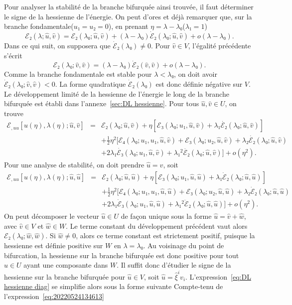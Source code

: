 \documentclass[12pt, final]{amsart}
\theoremstyle{definition}
\begin{document}
Pour analyser la stabilité de la branche bifurquée ainsi trouvée, il faut déterminer le signe de la hessienne de l'énergie. On peut d'ores et déjà remarquer que, sur la branche fondamentale(\(u₁ = u₂ = 0\)), en prenant \(η = λ - λ₀\)(\(λ₁ = 1\))
\begin{equation}
 ℰ₂(λ ; \hat{u}, \hat{v}) =ℰ₂(λ₀ ;
 \hat{u}, \hat{v}) +(λ - λ₀) \dot{ℰ}₂(λ₀ ;
 \hat{u}, \hat{v}) + o(λ - λ₀) .
\end{equation}
Dans ce qui suit, on supposera que \(\dot{ℰ}₂(λ₀) \neq 0\). Pour \(\hat{v}∈V\), l'égalité précédente s'écrit
\begin{equation}
 ℰ₂(λ₀ ; \hat{v}, \hat{v}) =(λ - λ₀)
 \dot{ℰ}₂(\hat{v}, \hat{v}) + o(λ - λ₀) .
\end{equation}
Comme la branche fondamentale est stable pour \(λ < λ₀\), on doit avoir \(\dot{ℰ}₂(λ₀ ; \hat{v}, \hat{v}) < 0\). La forme quadratique \(\dot{ℰ}₂(λ₀)\) est donc définie négative sur \(V\). Le développement limité de la hessienne de l'énergie le long de la branche bifurquée est établi dans l'annexe~\ref{sec:DL hessienne}. Pour tous \(\hat{u}, \hat{v}∈U\), on trouve
\begin{eqnarray}
 ℰ_{, u u} [u(η), λ(η) ; \hat{u}, \hat{v}] &
 = & ℰ₂(λ₀ ; \hat{u}, \hat{v}) + η [ℰ₃
 (λ₀ ; u₁, \hat{u}, \hat{v})  + λ₁
 \dot{ℰ₂}(λ₀ ; \hat{u}, \hat{v})] \nonumber\\
 & & + \tfrac{1}{2} η^2 [ℰ₄(λ₀ ; u₁, u₁,
 \hat{u}, \hat{v}) +ℰ₃(λ₀ ; u₂, \hat{u},
 \hat{v}) + λ₂ \dot{ℰ₂}(λ₀ ; \hat{u}, \hat{v})
 \nonumber\\
 & & + 2 λ₁ \dot{ℰ₃}(λ₀ ; u₁,
 \hat{u}, \hat{v}) + λ₁^2 \ddot{ℰ₂}(λ₀ ; \hat{u},
 \hat{v}) ] + o(η^2) . \label{eq:DL hessienne}
\end{eqnarray}
Pour une analyse de stabilité, on doit prendre \(\hat{u} = \hat{v}\), soit
\begin{eqnarray}
 ℰ_{, u u} [u(η), λ(η) ; \hat{u}, \hat{u}] &
 = & ℰ₂(λ₀ ; \hat{u}, \hat{u}) + η [ℰ₃
 (λ₀ ; u₁, \hat{u}, \hat{u}) + λ₁ \dot{ℰ}₂
 (λ₀ ; \hat{u}, \hat{u})] \nonumber\\
 & & + \tfrac{1}{2} η^2 [ℰ₄(λ₀ ; u₁, u₁, \hat{u},
 \hat{u}) +ℰ₃(λ₀ ; u₂, \hat{u}, \hat{u}) + λ₂
 \dot{ℰ}₂(λ₀ ; \hat{u}, \hat{u}) \nonumber\\
 & & + 2 λ₁ \dot{ℰ}₃(λ₀ ; u₁,
 \hat{u}, \hat{u}) + λ₁^2 \ddot{ℰ}₂(λ₀ ; \hat{u},
 \hat{u})] + o(η^2) . \label{eq:DL hessienne diag}
\end{eqnarray}
On peut décomposer le vecteur \(\hat{u}∈U\) de fa{\c c}on unique sous la forme \(\hat{u} = \hat{v} + \hat{w}\), avec \(\hat{v}∈V\) et \(\hat{w}∈W\). Le terme constant du développement précédent vaut alors \(ℰ₂(λ₀ ; \hat{w}, \hat{w})\). Si \(\hat{w} \neq 0\), alors ce terme constant est strictement positif, puisque la hessienne est définie positive sur \(W\) en \(λ = λ₀\). Au voisinage du point de bifurcation, la hessienne sur la branche bifurquée est donc positive pour tout \(\hat{u}∈U\) ayant une composante dans \(W\). Il suffit donc d'étudier le signe de la hessienne sur la branche bifurquée pour \(\hat{u}∈V\), soit \(\hat{u} = \hat{ξ}^i v_i\). L'expression~\eqref{eq:DL hessienne diag} se simplifie alors sous la forme suivante Compte-tenu de l'expression~\eqref{eq:20220524134613}
\end{document}
